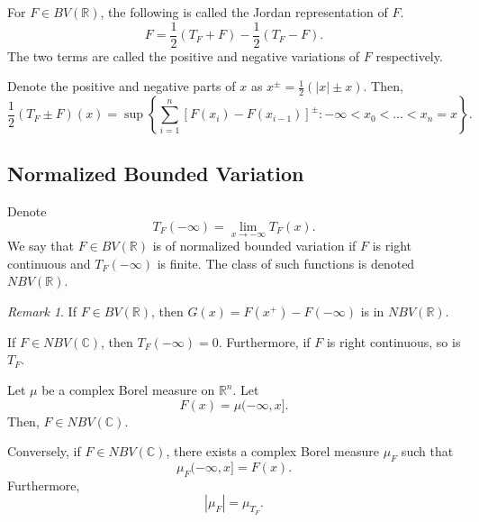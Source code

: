 \documentclass[11pt]{article}
\renewcommand{\C}{\mathbb{C}}
\newcommand{\R}{\mathbb{R}}
\theoremstyle{definition}
\theoremstyle{remark}
\newtheorem*{remark}{Remark}
\begin{document}
    \begin{definition}
        For $F \in BV(\R)$, the following is called the Jordan representation of $F$.
        \[
            F = \frac{1}{2}(T_F + F) - \frac{1}{2}(T_F - F).
        \] The two terms are called the positive and negative variations of $F$
        respectively.
    \end{definition}

    \begin{lemma}
        Denote the positive and negative parts of $x$ as $x^\pm = \frac{1}{2}(|x| \pm
        x)$. Then, \[
            \frac{1}{2}(T_F \pm F)(x) = \sup\left\{\sum_{i = 1}^n \left[F(x_i) -
            F(x_{i - 1})\right]^\pm : -\infty < x_0 < \dots < x_n = x\right\}.
        \]
    \end{lemma}


    \subsection{Normalized Bounded Variation}

    \begin{definition}
        Denote \[
            T_F(-\infty) = \lim_{x \to -\infty} T_F(x).
        \] We say that $F \in BV(\R)$ is of normalized bounded variation if $F$ is
        right continuous and $T_F(-\infty)$ is finite. The class of such functions is
        denoted $NBV(\R)$.

        \begin{remark}
            If $F \in BV(\R)$, then $G(x) = F(x^+) - F(-\infty)$ is in $NBV(\R)$.
        \end{remark}
    \end{definition}

    \begin{lemma}
        If $F \in NBV(\C)$, then $T_F(-\infty) = 0$. Furthermore, if $F$ is right
        continuous, so is $T_F$.
    \end{lemma}

    \begin{theorem}
        Let $\mu$ be a complex Borel measure on $\R^n$. Let \[
            F(x) = \mu(-\infty, x].
        \] Then, $F \in NBV(\C)$.

        Conversely, if $F \in NBV(\C)$, there exists a complex Borel measure $\mu_F$
        such that \[
            \mu_F(-\infty, x] = F(x).
        \] Furthermore, \[
            |\mu_F| = \mu_{T_F}.
        \]
    \end{theorem}
\end{document}

